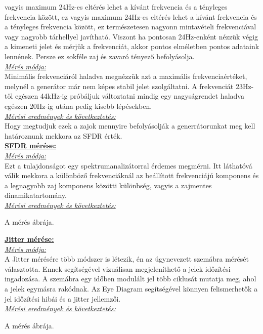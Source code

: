 \documentclass[a4paper,12pt]{article}
\begin{document}
		vagyis maximum 24Hz-es eltérés lehet a kívánt frekvencia és a tényleges frekvencia között, ez vagyis maximum 24Hz-es eltérés lehet a kívánt frekvencia és a tényleges frekvencia között, ez természetesen nagyonn mintavételi frekvenciával vagy nagyobb tárhellyel javítható.  Viszont ha pontosan 24Hz-enként nézzük végig a kimeneti jelet és mérjük a frekvenciát, akkor pontos elméletben pontos adataink lennének. Persze ez sokféle zaj és zavaró tényező befolyásolja. \\
		\textit{\underline{Mérés módja:}}\\
		Minimális frekvenciáról haladva megnézzük azt a maximális frekvenciaértéket, melynél a generátor már nem képes stabil jelet szolgáltatni. A frekvenciát 23Hz-től egészen 44kHz-ig próbáljuk változtatni mindig egy nagyságrendet haladva egészen 20Hz-ig utána pedig kisebb lépésekben.\\
		\textit{\underline{Mérési eredmények és következtetés:}}\\
		Hogy megtudjuk ezek a zajok mennyire befolyásolják a generrátorunkat meg kell határoznunk mekkora az SFDR érték. \\
		\textbf{\underline{SFDR mérése:}}\\
		\textit{\underline{Mérés módja:}}\\
		Ezt a tulajdonságot egy spektrumanalizátorral érdemes megmérni. Itt láthatóvá válik mekkora a különböző frekvenciáknál az beállított frekvenciájú komponens és a legnagyobb zaj komponens közötti különbség, vagyis a zajmentes dinamikatartomány.\\
		\textit{\underline{Mérési eredmények és következtetés:}}\\
		\begin{center}
			A mérés ábrája.
		\end{center}
		\textbf{\underline{Jitter mérése:}}\\
		\textit{\underline{Mérés módja:}}\\
		A Jitter mérésére több módszer is létezik, én az úgynevezett szemábra mérését választotta. Ennek segítségével vizuálisan megjeleníthető a jelek időzítési ingadozása. A szemábra egy időben modulált jel több ciklusát mutatja meg, ahol a jelek egymásra rakódnak. Az Eye Diagram segítségével könnyen felismerhetők a jel időzítési hibái és a jitter jellemzői.\\
		\textit{\underline{Mérési eredmények és következtetés:}}\\
		\begin{center}
			A mérés ábrája.
		\end{center}
\end{document}

